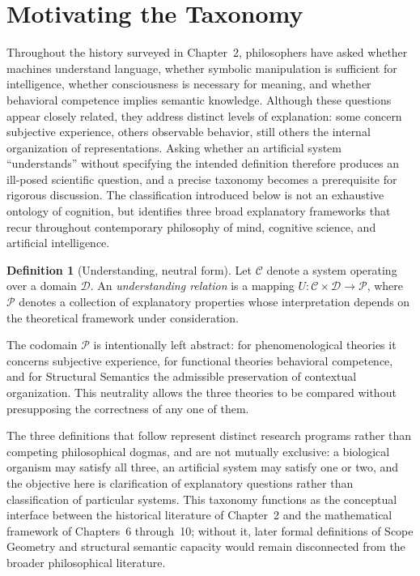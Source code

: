 \documentclass[11pt,twoside,openright]{book}
\numberwithin{equation}{chapter}
\theoremstyle{definition}
\newtheorem{definition}{Definition}[chapter]
\theoremstyle{plain}
\theoremstyle{remark}
\theoremstyle{definition}
\newcommand{\Domain}{\mathcal{D}}
\newcommand{\System}{\mathcal{C}}
\begin{document}
\section{Motivating the Taxonomy}

Throughout the history surveyed in Chapter~2, philosophers have asked
whether machines understand language, whether symbolic manipulation is
sufficient for intelligence, whether consciousness is necessary for
meaning, and whether behavioral competence implies semantic knowledge.
Although these questions appear closely related, they address distinct
levels of explanation: some concern subjective experience, others
observable behavior, still others the internal organization of
representations. Asking whether an artificial system ``understands''
without specifying the intended definition therefore produces an
ill-posed scientific question, and a precise taxonomy becomes a
prerequisite for rigorous discussion. The classification introduced below
is not an exhaustive ontology of cognition, but identifies three broad
explanatory frameworks that recur throughout contemporary philosophy of
mind, cognitive science, and artificial intelligence.

\begin{definition}[Understanding, neutral form]
Let $\System$ denote a system operating over a domain $\Domain$. An
\emph{understanding relation} is a mapping
$U:\System\times\Domain\to\mathcal{P}$, where $\mathcal{P}$ denotes a
collection of explanatory properties whose interpretation depends on the
theoretical framework under consideration.
\end{definition}

The codomain $\mathcal{P}$ is intentionally left abstract: for
phenomenological theories it concerns subjective experience, for
functional theories behavioral competence, and for Structural Semantics
the admissible preservation of contextual organization. This neutrality
allows the three theories to be compared without presupposing the
correctness of any one of them.

The three definitions that follow represent distinct research programs
rather than competing philosophical dogmas, and are not mutually
exclusive: a biological organism may satisfy all three, an artificial
system may satisfy one or two, and the objective here is clarification of
explanatory questions rather than classification of particular systems.
This taxonomy functions as the conceptual interface between the
historical literature of Chapter~2 and the mathematical framework of
Chapters~6 through~10; without it, later formal definitions of Scope
Geometry and structural semantic capacity would remain disconnected from
the broader philosophical literature.
\end{document}
